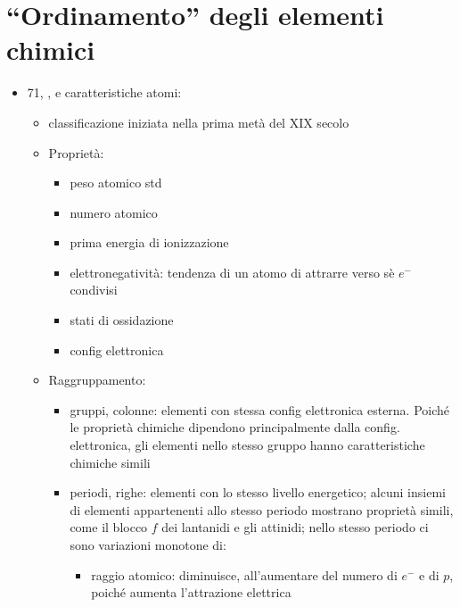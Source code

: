 \documentclass[letterpaper,10pt,english]{jupyterBook}
\begin{document}
\section{“Ordinamento” degli elementi chimici}
\label{\detokenize{ch/units:ordinamento-degli-elementi-chimici}}\begin{itemize}
\item {} 
\sphinxhyphen{}71,
  , e caratteristiche atomi:
\begin{itemize}
\item {} 
\sphinxAtStartPar
classificazione iniziata nella prima metà del XIX secolo

\item {} 
\sphinxAtStartPar
Proprietà:
\begin{itemize}
\item {} 
\sphinxAtStartPar
peso atomico std

\item {} 
\sphinxAtStartPar
numero atomico

\item {} 
\sphinxAtStartPar
prima energia di ionizzazione

\item {} 
\sphinxAtStartPar
elettronegatività: tendenza di un atomo di attrarre verso sè \(e^-\) condivisi

\item {} 
\sphinxAtStartPar
stati di ossidazione 

\item {} 
\sphinxAtStartPar
config elettronica

\end{itemize}

\item {} 
\sphinxAtStartPar
Raggruppamento:
\begin{itemize}
\item {} 
\sphinxAtStartPar
gruppi, colonne: elementi con stessa config elettronica esterna. Poiché le proprietà chimiche dipendono principalmente dalla config. elettronica, gli elementi nello stesso gruppo hanno caratteristiche chimiche simili

\item {} 
\sphinxAtStartPar
periodi, righe: elementi con lo stesso livello energetico; alcuni insiemi di elementi appartenenti allo stesso periodo mostrano proprietà simili, come il blocco \(f\) dei lantanidi e gli attinidi; nello stesso periodo ci sono variazioni monotone di:
\begin{itemize}
\item {} 
\sphinxAtStartPar
raggio atomico: diminuisce, all’aumentare del numero di \(e^-\) e di \(p\), poiché aumenta l’attrazione elettrica


\end{itemize}
\end{itemize}
\end{itemize}
\end{itemize}
\end{document}
